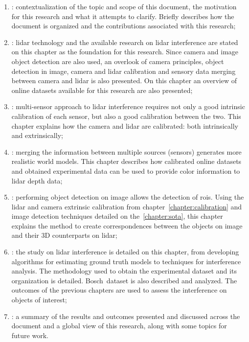 \begin{enumerate}[label={\textbf{Chapter \arabic* -}}, align=left, itemindent=\leftmargini]
	\item \textit{}: contextualization of the topic and scope of this document, the motivation for this research and what it attempts to clarify. Briefly describes how the document is organized and the contributions associated with this research;
	\item \textit{}: \ac{lidar} technology and the available research on \ac{lidar} interference are stated on this chapter as the foundation for this research. Since camera and image object detection are also used, an overlook of camera principles, object detection in image, camera and \ac{lidar} calibration and sensory data merging between camera and \ac{lidar} is also presented. On this chapter an overview of online datasets available for this research are also presented;
	\item \textit{}: multi-sensor approach to \ac{lidar} interference requires not only a good intrinsic calibration of each sensor, but also a good calibration between the two. This chapter explains how the camera and \ac{lidar} are calibrated: both intrinsically and extrinsically;
	\item \textit{}: merging the information between multiple sources (sensors) generates more realistic world models. This chapter describes how calibrated online datasets and obtained experimental data can be used to provide color information to \ac{lidar} depth data;
	\item \textit{}: performing object detection on image allows the detection of \aclp{roi}. Using the \ac{lidar} and camera extrinsic calibration from chapter~\ref{chapter:calibration} and image detection techniques detailed on the~\ref{chapter:sota}, this chapter explains the method to create correspondences between the objects on image and their 3D counterparts on \ac{lidar};
	\item \textit{}: the study on \ac{lidar} interference is detailed on this chapter, from developing algorithms for estimating ground truth models to techniques for interference analysis. The methodology used to obtain the experimental dataset and its organization is detailed. Bosch\cp~dataset is also described and analyzed. The outcomes of the previous chapters are used to assess the interference on objects of interest;
	\item \textit{}: a summary of the results and outcomes presented and  discussed across the document and a global view of this research, along with some topics for future work.
\end{enumerate}

